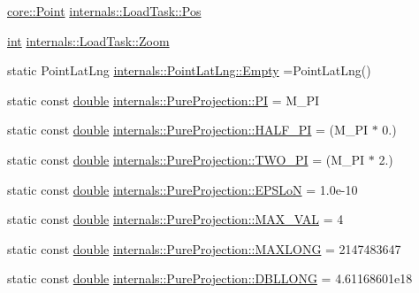 \begin{DoxyCompactItemize}
\item 
\hyperlink{structcore_1_1_point}{core\-::\-Point} \hyperlink{group___o_p_map_widget_gaaaf77679e16ef9213c85fbfaff467339}{internals\-::\-Load\-Task\-::\-Pos}
\item 
\hyperlink{ioapi_8h_a787fa3cf048117ba7123753c1e74fcd6}{int} \hyperlink{group___o_p_map_widget_gaee096bc3882220e2ed2b8b167cecb9ad}{internals\-::\-Load\-Task\-::\-Zoom}
\item 
static Point\-Lat\-Lng \hyperlink{group___o_p_map_widget_gac62d167bf1e7f0374f7e536e64320c13}{internals\-::\-Point\-Lat\-Lng\-::\-Empty} =Point\-Lat\-Lng()
\item 
static const \hyperlink{_super_l_u_support_8h_a8956b2b9f49bf918deed98379d159ca7}{double} \hyperlink{group___o_p_map_widget_gaab58a4dd2b2aec1a140df479c3da07c5}{internals\-::\-Pure\-Projection\-::\-P\-I} = M\-\_\-\-P\-I
\item 
static const \hyperlink{_super_l_u_support_8h_a8956b2b9f49bf918deed98379d159ca7}{double} \hyperlink{group___o_p_map_widget_ga767800d1664d3a7d0255a1d1d55bea69}{internals\-::\-Pure\-Projection\-::\-H\-A\-L\-F\-\_\-\-P\-I} = (M\-\_\-\-P\-I $\ast$ 0.)
\item 
static const \hyperlink{_super_l_u_support_8h_a8956b2b9f49bf918deed98379d159ca7}{double} \hyperlink{group___o_p_map_widget_gac2ca007c6c6f6c095902daca2254d4bb}{internals\-::\-Pure\-Projection\-::\-T\-W\-O\-\_\-\-P\-I} = (M\-\_\-\-P\-I $\ast$ 2.)
\item 
static const \hyperlink{_super_l_u_support_8h_a8956b2b9f49bf918deed98379d159ca7}{double} \hyperlink{group___o_p_map_widget_ga48583ac82eb87f081f2dc32a9ab39349}{internals\-::\-Pure\-Projection\-::\-E\-P\-S\-Lo\-N} = 1.\-0e-\/10
\item 
static const \hyperlink{_super_l_u_support_8h_a8956b2b9f49bf918deed98379d159ca7}{double} \hyperlink{group___o_p_map_widget_ga34e30a80435ba07c4e95b56f24935ceb}{internals\-::\-Pure\-Projection\-::\-M\-A\-X\-\_\-\-V\-A\-L} = 4
\item 
static const \hyperlink{_super_l_u_support_8h_a8956b2b9f49bf918deed98379d159ca7}{double} \hyperlink{group___o_p_map_widget_gad58d07a94d560015458a3411190b5cc0}{internals\-::\-Pure\-Projection\-::\-M\-A\-X\-L\-O\-N\-G} = 2147483647
\item 
static const \hyperlink{_super_l_u_support_8h_a8956b2b9f49bf918deed98379d159ca7}{double} \hyperlink{group___o_p_map_widget_gaffa95138ab57a5c0267eb66399bbdc5c}{internals\-::\-Pure\-Projection\-::\-D\-B\-L\-L\-O\-N\-G} = 4.\-61168601e18
\item 

\end{DoxyCompactItemize}
